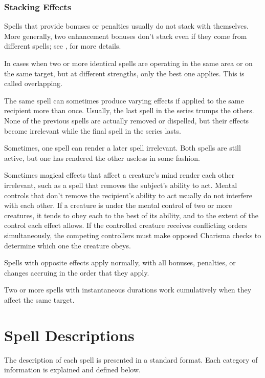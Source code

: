 \subsubsection{Stacking Effects}
Spells that provide bonuses or penalties usually do not stack with themselves. More generally, two enhancement bonuses don't stack even if they come from different spells; see , for more details.

 In cases when two or more identical spells are operating in the same area or on the same target, but at different strengths, only the best one applies. This is called overlapping.

 The same spell can sometimes produce varying effects if applied to the same recipient more than once. Usually, the last spell in the series trumps the others. None of the previous spells are actually removed or dispelled, but their effects become irrelevant while the final spell in the series lasts.

 Sometimes, one spell can render a later spell irrelevant. Both spells are still active, but one has rendered the other useless in some fashion.

 Sometimes magical effects that affect a creature's mind render each other irrelevant, such as a spell that removes the subject's ability to act. Mental controls that don't remove the recipient's ability to act usually do not interfere with each other. If a creature is under the mental control of two or more creatures, it tends to obey each to the best of its ability, and to the extent of the control each effect allows. If the controlled creature receives conflicting orders simultaneously, the competing controllers must make opposed Charisma checks to determine which one the creature obeys.

 Spells with opposite effects apply normally, with all bonuses, penalties, or changes accruing in the order that they apply.

 Two or more spells with instantaneous durations work cumulatively when they affect the same target.

\section{Spell Descriptions}
The description of each spell is presented in a standard format. Each category of information is explained and defined below.

